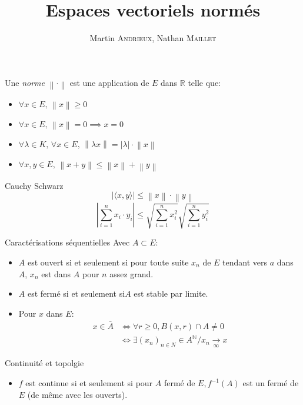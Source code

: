 \documentclass[french, a4paper, 11pt, twocolumn]{article}
\title{Espaces vectoriels normés}
\author{Martin \textsc{Andrieux}, Nathan \textsc{Maillet}}
\date{}
\newcommand{\ssi}{si et seulement si\xspace}		%
\newcommand{\norme}[1]{\left\| #1\right\|}
\newcommand{\abs}[1]{\left\lvert #1\right\rvert}
\newcommand{\limit}[1]{\underset{#1}{\rightarrow}}  %
\newcommand{\N}{\mathbb{N}}   %
\newcommand{\R}{\mathbb{R}}   %
\begin{document}
\maketitle

\begin{definition}
  Une \emph{norme} $\norme{\cdot}$ est une application de $E$ dans $\R$ telle que:
  \begin{itemize}[label=$\bullet$]
    \item $\forall x\in E,\,\norme{x}\geqslant 0$
    \item $\forall x\in E,\,\norme{x}=0\implies x=0$
    \item $\forall\lambda\in K,\,\forall x\in E,\, \norme{\lambda x}=\abs{\lambda} \cdot \norme{x}$
    \item $\forall x,y\in E,\, \norme{x+y}\leqslant\norme{x}+\norme{y}$
  \end{itemize}
\end{definition}

\begin{theoreme}{Cauchy Schwarz}
  \[\left\lvert \langle x,y\rangle\right\rvert\leqslant\norme{x}\cdot\norme{y}\]
  \tcblower
  \[\abs{\sum_{i=1}^n x_{i}\cdot y_{i}}\leqslant \sqrt{\sum_{i=1}^n x_{i}^{2}}\sqrt{\sum_{i=1}^n y_{i}^{2}}\]
\end{theoreme}

\begin{theoreme}{Caractérisations séquentielles}
    Avec $A \subset E$:
    \begin{itemize}[label=$\bullet$]
        \item $A$ est ouvert \ssi pour toute suite $x_{n}$ de $E$ tendant vers $a$ dans $A$, $x_{n}$ est dans $A$ pour $n$ assez grand.
        \item $A$ est fermé \ssi $A$ est stable par limite.
        \item Pour $x$ dans $E$:
        \begin{align*} 
            x \in \bar{A} & \iff \forall r \geq 0, B(x,r) \cap A \neq 0 \\
                          & \iff \exists {(x_n)}_{n\in N} \in A^{\N} / x_n \limit{\infty} x
        \end{align*}
    \end{itemize}
\end{theoreme}

\begin{theoreme}{Continuité et topolgie}
    \begin{itemize}[label=$\bullet$]
        \item $f$ est continue \ssi pour $A$ fermé de $E$,$\, f^{-1}(A)$ est un fermé de $E$ (de même avec les ouverts).
    \end{itemize}
\end{theoreme}
\end{document}
